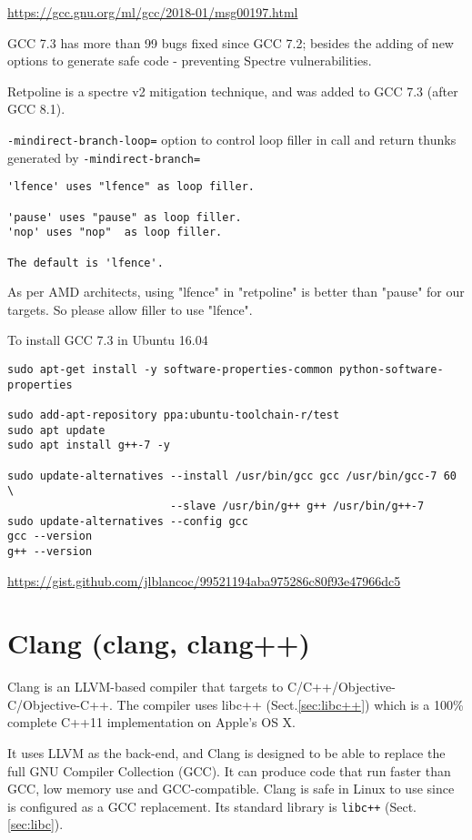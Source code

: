 \url{https://gcc.gnu.org/ml/gcc/2018-01/msg00197.html}

GCC 7.3 has more than 99 bugs fixed since GCC 7.2; besides the adding of new
options to generate safe code - preventing Spectre vulnerabilities.

Retpoline is a spectre v2 mitigation technique, and was added to GCC 7.3 (after
GCC 8.1).

\verb!-mindirect-branch-loop=! option to control loop filler in call
and return thunks generated by \verb!-mindirect-branch=!

\begin{verbatim}
'lfence' uses "lfence" as loop filler.  

'pause' uses "pause" as loop filler.  
'nop' uses "nop"  as loop filler. 

The default is 'lfence'.
\end{verbatim}
As per AMD architects, using "lfence" in "retpoline" is better than "pause" for our targets.
So please allow filler to use "lfence". 

To install GCC 7.3 in Ubuntu 16.04
\begin{verbatim}
sudo apt-get install -y software-properties-common python-software-properties

sudo add-apt-repository ppa:ubuntu-toolchain-r/test
sudo apt update
sudo apt install g++-7 -y

sudo update-alternatives --install /usr/bin/gcc gcc /usr/bin/gcc-7 60 \
                         --slave /usr/bin/g++ g++ /usr/bin/g++-7 
sudo update-alternatives --config gcc
gcc --version
g++ --version
\end{verbatim}
\url{https://gist.github.com/jlblancoc/99521194aba975286c80f93e47966dc5}


\section{Clang (clang, clang++)}
\label{sec:clang}

Clang is an LLVM-based compiler that targets to C/C++/Objective-C/Objective-C++.
The compiler uses libc++ (Sect.\ref{sec:libc++}) which is a 100\% complete C++11
implementation on Apple's OS X.

It uses LLVM as the back-end, and Clang is designed to be able to replace the
full GNU Compiler Collection (GCC). It can  produce code that run faster than
GCC, low memory use and GCC-compatible. Clang is safe in Linux to use since is
configured as a GCC replacement. Its standard library is \verb!libc++!
(Sect.\ref{sec:libc}).


